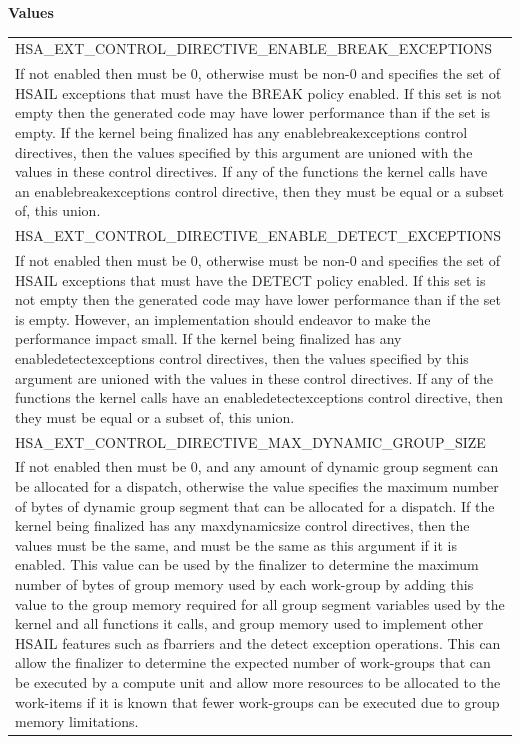 \documentclass[final,oneside]{book}
\newcommand{\reftyp}[1]{#1}
\newcommand{\refenu}[1]{\reftyp{#1}}
\begin{document}
\noindent\textbf{Values}\\[-5mm]
\begin{longtable}{@{\hspace{2em}}p{\linewidth-2em}}
\hspace{-2em}\refenu{HSA_\-EXT_\-CONTROL_\-DIRECTIVE_\-ENABLE_\-BREAK_\-EXCEPTIONS}\\If not enabled then must be 0, otherwise must be non-0 and specifies the set of HSAIL exceptions that must have the BREAK policy enabled. If this set is not empty then the generated code may have lower performance than if the set is empty. If the kernel being finalized has any enablebreakexceptions control directives, then the values specified by this argument are unioned with the values in these control directives. If any of the functions the kernel calls have an enablebreakexceptions control directive, then they must be equal or a subset of, this union.\\[2mm]
\hspace{-2em}\refenu{HSA_\-EXT_\-CONTROL_\-DIRECTIVE_\-ENABLE_\-DETECT_\-EXCEPTIONS}\\If not enabled then must be 0, otherwise must be non-0 and specifies the set of HSAIL exceptions that must have the DETECT policy enabled. If this set is not empty then the generated code may have lower performance than if the set is empty. However, an implementation should endeavor to make the performance impact small. If the kernel being finalized has any enabledetectexceptions control directives, then the values specified by this argument are unioned with the values in these control directives. If any of the functions the kernel calls have an enabledetectexceptions control directive, then they must be equal or a subset of, this union.\\[2mm]
\hspace{-2em}\refenu{HSA_\-EXT_\-CONTROL_\-DIRECTIVE_\-MAX_\-DYNAMIC_\-GROUP_\-SIZE}\\If not enabled then must be 0, and any amount of dynamic group segment can be allocated for a dispatch, otherwise the value specifies the maximum number of bytes of dynamic group segment that can be allocated for a dispatch. If the kernel being finalized has any maxdynamicsize control directives, then the values must be the same, and must be the same as this argument if it is enabled. This value can be used by the finalizer to determine the maximum number of bytes of group memory used by each work-group by adding this value to the group memory required for all group segment variables used by the kernel and all functions it calls, and group memory used to implement other HSAIL features such as fbarriers and the detect exception operations. This can allow the finalizer to determine the expected number of work-groups that can be executed by a compute unit and allow more resources to be allocated to the work-items if it is known that fewer work-groups can be executed due to group memory limitations.\\[2mm]

\end{longtable}
\end{document}
